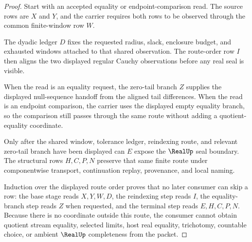 \begin{proof}
Start with an accepted equality or endpoint-comparison read. The source rows are $X$ and $Y$, and the carrier requires both rows to be observed through the common finite-window row $W$.

The dyadic ledger $D$ fixes the requested radius, slack, enclosure budget, and exhausted windows attached to that shared observation. The route-order row $I$ then aligns the two displayed regular Cauchy observations before any real seal is visible.

When the read is an equality request, the zero-tail branch $Z$ supplies the displayed null-sequence handoff from the aligned tail differences. When the read is an endpoint comparison, the carrier uses the displayed empty equality branch, so the comparison still passes through the same route without adding a quotient-equality coordinate.

Only after the shared window, tolerance ledger, reindexing route, and relevant zero-tail branch have been displayed can $E$ expose the $\RealUp$ seal boundary. The structural rows $H,C,P,N$ preserve that same finite route under componentwise transport, continuation replay, provenance, and local naming.

Induction over the displayed route order proves that no later consumer can skip a row: the base stage reads $X,Y,W,D$, the reindexing step reads $I$, the equality-branch step reads $Z$ when requested, and the terminal step reads $E,H,C,P,N$. Because there is no coordinate outside this route, the consumer cannot obtain quotient stream equality, selected limits, host real equality, trichotomy, countable choice, or ambient $\RealUp$ completeness from the packet.
\end{proof}


